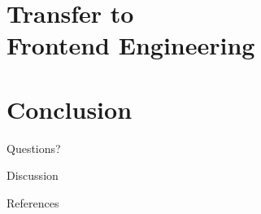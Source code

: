 \documentclass{beamer}
\begin{document}
\section{Transfer to\\Frontend Engineering}

\begin{frame}

\end{frame}


\section{Conclusion}
\begin{frame}[focus]
	Questions?
\end{frame}

\begin{frame}[focus]
	Discussion
\end{frame}

\appendix
\begin{frame}[allowframebreaks]{References}
	
	
\end{frame}
\end{document}

